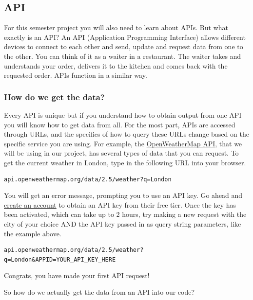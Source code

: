 \documentclass[
]{article}
\begin{document}
\hypertarget{api}{%
\subsection{API}\label{api}}

For this semester project you will also need to learn about APIs. But what exactly is an API? An API (Application Programming Interface) allows different devices to connect to each other and send, update and request data from one to the other. You can think of it as a waiter in a restaurant. The waiter takes and understands your order, delivers it to the kitchen and comes back with the requested order. APIs function in a similar way.

\hypertarget{how-do-we-get-the-data}{%
\subsubsection*{How do we get the data?}\label{how-do-we-get-the-data}}

Every API is unique but if you understand how to obtain output from one API you will know how to get data from all.
For the most part, APIs are accessed through URLs, and the specifics of how to query these URLs change based on the specific service you are using. For example, the \href{https://openweathermap.org/api}{OpenWeatherMap API}, that we will be using in our project, has several types of data that you can request. To get the current weather in London, type in the following URL into your browser.

\begin{verbatim}
api.openweathermap.org/data/2.5/weather?q=London
\end{verbatim}

You will get an error message, prompting you to use an API key. Go ahead and \href{https://home.openweathermap.org/users/sign_up}{create an account} to obtain an API key from their free tier. Once the key has been activated, which can take up to 2 hours, try making a new request with the city of your choice AND the API key passed in as query string parameters, like the example above.

\begin{verbatim}
api.openweathermap.org/data/2.5/weather?q=London&APPID=YOUR_API_KEY_HERE
\end{verbatim}

Congrats, you have made your first API request!

So how do we actually get the data from an API into our code?
\end{document}
